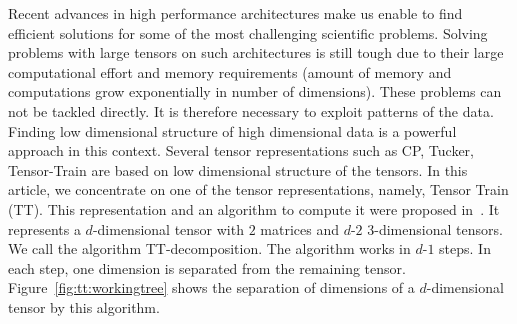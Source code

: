 \documentclass[runningheads]{llncs}
\begin{document}
Recent advances in high performance architectures make us enable to find efficient solutions for some of the most challenging scientific problems. Solving problems with large tensors on such architectures is still tough due to their large computational effort and memory requirements (amount of memory and computations grow exponentially in number of dimensions). These problems can not be tackled directly. It is therefore necessary to exploit patterns of the data. Finding low dimensional structure of high dimensional data is a powerful approach in this context. Several tensor representations such as CP, Tucker, Tensor-Train are based on low dimensional structure of the tensors. In this article, we concentrate on one of the tensor representations, namely, Tensor Train (TT). This representation and an algorithm to compute it were proposed in~\cite{tt}. It represents a $d$-dimensional tensor with $2$ matrices and $d$-$2$ 3-dimensional tensors. We call the algorithm TT-decomposition. The algorithm works in $d$-$1$ steps. In each step, one dimension is separated from the remaining tensor. Figure~\ref{fig:tt:workingtree} shows the separation of dimensions of a $d$-dimensional tensor by this algorithm.
\end{document}
